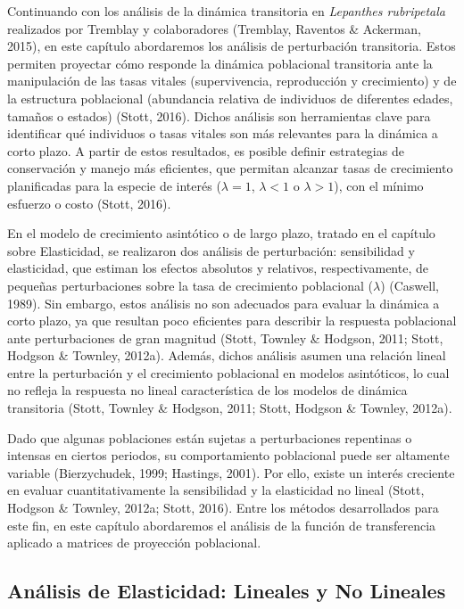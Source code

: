 \documentclass[
  12pt,
  letterpaper,
]{book}
\begin{document}
Continuando con los análisis de la dinámica transitoria en
\emph{Lepanthes rubripetala} realizados por Tremblay y colaboradores
(Tremblay, Raventos \& Ackerman, 2015), en este capítulo abordaremos los
análisis de perturbación transitoria. Estos permiten proyectar cómo
responde la dinámica poblacional transitoria ante la manipulación de las
tasas vitales (supervivencia, reproducción y crecimiento) y de la
estructura poblacional (abundancia relativa de individuos de diferentes
edades, tamaños o estados) (Stott, 2016). Dichos análisis son
herramientas clave para identificar qué individuos o tasas vitales son
más relevantes para la dinámica a corto plazo. A partir de estos
resultados, es posible definir estrategias de conservación y manejo más
eficientes, que permitan alcanzar tasas de crecimiento planificadas para
la especie de interés (\(\lambda = 1\), \(\lambda < 1\) o
\(\lambda > 1\)), con el mínimo esfuerzo o costo (Stott, 2016).

En el modelo de crecimiento asintótico o de largo plazo, tratado en el
capítulo sobre Elasticidad, se realizaron dos análisis de perturbación:
sensibilidad y elasticidad, que estiman los efectos absolutos y
relativos, respectivamente, de pequeñas perturbaciones sobre la tasa de
crecimiento poblacional (\(\lambda\)) (Caswell, 1989). Sin embargo,
estos análisis no son adecuados para evaluar la dinámica a corto plazo,
ya que resultan poco eficientes para describir la respuesta poblacional
ante perturbaciones de gran magnitud (Stott, Townley \& Hodgson, 2011;
Stott, Hodgson \& Townley, 2012a). Además, dichos análisis asumen una
relación lineal entre la perturbación y el crecimiento poblacional en
modelos asintóticos, lo cual no refleja la respuesta no lineal
característica de los modelos de dinámica transitoria (Stott, Townley \&
Hodgson, 2011; Stott, Hodgson \& Townley, 2012a).

Dado que algunas poblaciones están sujetas a perturbaciones repentinas o
intensas en ciertos periodos, su comportamiento poblacional puede ser
altamente variable (Bierzychudek, 1999; Hastings, 2001). Por ello,
existe un interés creciente en evaluar cuantitativamente la sensibilidad
y la elasticidad no lineal (Stott, Hodgson \& Townley, 2012a; Stott,
2016). Entre los métodos desarrollados para este fin, en este capítulo
abordaremos el análisis de la función de transferencia aplicado a
matrices de proyección poblacional.

\subsection{Análisis de Elasticidad: Lineales y No
Lineales}\label{anuxe1lisis-de-elasticidad-lineales-y-no-lineales}
\end{document}
